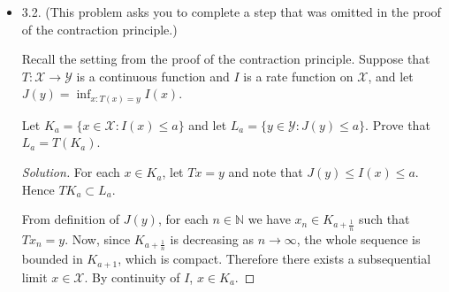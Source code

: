 \begin{itemize}
\begin{proof}[Solution]
	Now consider the case $\rho = \text{Ber}(\frac{1}{4})$. In this case the support of all empirical measures in on $M_1(\{0,1\} )$. All measures $\nu$ are characterized by a single $z \in [0,1]$ by $\nu(z) = (1 - z) \delta_0 + z \delta_1$. We compute the mean, entropy and the sample variance:

	\[
		\mathbb{E}_\nu X = z
	.\] 
	\[
		\mathbb{E}_\nu (X - z)^2
		= (1 - z)^2 z + z^2 (1 - z) = z( 1- z)
	.\] 
	\[
		H(\nu | \rho) = (1 - z) \log \frac{1 - z}{\frac{3}{4}} + z \log \frac{z}{\frac{1}{4}}
	.\] 
	The rate function is given by the following constraint optimization problem
	\[
		\begin{cases}
			J(y) = \min_{z \in (0,1)} (1 - z) \log \frac{1 - z}{\frac{3}{4}} + z \log \frac{z}{\frac{1}{4}}  \\
			\text{s.t.} \quad z(1 - z) = y
		\end{cases}
	.\] 
	Using the method of Lagrange multipliers, we obtain the optimizing $z$ :
	\begin{align}
z^{*}(v)=\frac{1+\sqrt{1-4 v}}{2}
\end{align}
yielding the explicit formula
\begin{align}
J=\frac{1}{2}\left[(1-\sqrt{1-4 v}) \log \left(\frac{2(1-\sqrt{1-4 v})}{3}\right)+(1+\sqrt{1-4 v}) \log \left(\frac{1+\sqrt{1-4 v}}{8}\right)\right]
\end{align}

\end{proof}

\item 3.2. (This problem asks you to complete a step that was omitted in the proof of the contraction principle.)

Recall the setting from the proof of the contraction principle. Suppose that $T: \mathcal{X} \rightarrow \mathcal{Y}$ is a continuous function and $I$ is a rate function on $\mathcal{X}$, and let $J(y)=\inf _{x: T(x)=y} I(x)$.

Let $K_a=\{x \in \mathcal{X}: I(x) \leq a\}$ and let $L_a=\{y \in \mathcal{Y}: J(y) \leq a\}$. Prove that $L_a=T\left(K_a\right)$.
\begin{proof}[Solution]
	For each $x \in K_a$, let  $T x = y$ and note that  $J(y) \le I(x) \le a$. Hence $T K_a \subset L_a$.

	From definition of $J(y)$, for each $n \in \mathbb{N}$ we have $x_n \in K_{a + \frac{1}{n}}$ such that $T x_n = y$.
	Now, since $K_{a + \frac{1}{n}}$ is decreasing as $n \to \infty$, the whole sequence is bounded in $K_{a + 1}$, which is compact. Therefore there exists a subsequential limit $x \in \mathcal{X}$. By continuity of $I$, $x \in K_a$.


\end{proof}
\end{itemize}
